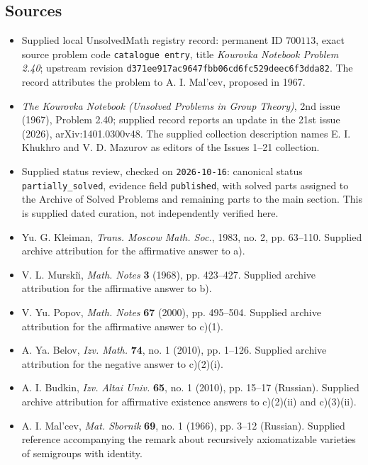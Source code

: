 \documentclass[11pt]{article}
\begin{document}
\subsection{Sources}
\begin{itemize}
\item Supplied local UnsolvedMath registry record: permanent ID \(700113\), exact source problem code \texttt{catalogue entry}, title \emph{Kourovka Notebook Problem 2.40}; upstream revision \texttt{d371ee917ac9647fbb06cd6fc529deec6f3dda82}. The record attributes the problem to A. I. Mal'cev, proposed in 1967.
\item \emph{The Kourovka Notebook (Unsolved Problems in Group Theory)}, 2nd issue (1967), Problem 2.40; supplied record reports an update in the 21st issue (2026), arXiv:1401.0300v48. The supplied collection description names E. I. Khukhro and V. D. Mazurov as editors of the Issues 1--21 collection.
\item Supplied status review, checked on \texttt{2026-10-16}: canonical status \texttt{partially\_solved}, evidence field \texttt{published}, with solved parts assigned to the Archive of Solved Problems and remaining parts to the main section. This is supplied dated curation, not independently verified here.
\item Yu. G. Kleiman, \emph{Trans. Moscow Math. Soc.}, 1983, no. 2, pp. 63--110. Supplied archive attribution for the affirmative answer to a).
\item V. L. Murski\u\i, \emph{Math. Notes} \textbf{3} (1968), pp. 423--427. Supplied archive attribution for the affirmative answer to b).
\item V. Yu. Popov, \emph{Math. Notes} \textbf{67} (2000), pp. 495--504. Supplied archive attribution for the affirmative answer to c)(1).
\item A. Ya. Belov, \emph{Izv. Math.} \textbf{74}, no. 1 (2010), pp. 1--126. Supplied archive attribution for the negative answer to c)(2)(i).
\item A. I. Budkin, \emph{Izv. Altai Univ.} \textbf{65}, no. 1 (2010), pp. 15--17 (Russian). Supplied archive attribution for affirmative existence answers to c)(2)(ii) and c)(3)(ii).
\item A. I. Mal'cev, \emph{Mat. Sbornik} \textbf{69}, no. 1 (1966), pp. 3--12 (Russian). Supplied reference accompanying the remark about recursively axiomatizable varieties of semigroups with identity.
\end{itemize}
\end{document}
